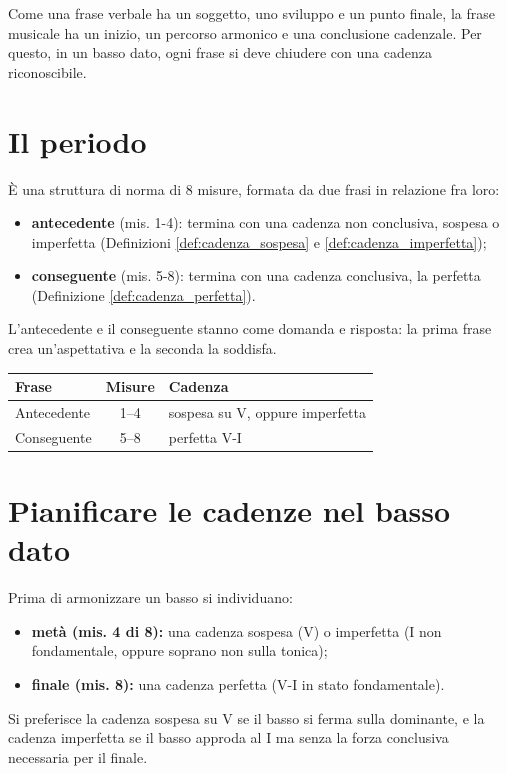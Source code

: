 Come una frase verbale ha un soggetto, uno sviluppo e un punto finale, la frase musicale ha un inizio, un percorso armonico e una conclusione cadenzale. Per questo, in un basso dato, ogni frase si deve chiudere con una cadenza riconoscibile.

\section{Il periodo}
\label{sec:periodo}

\begin{definizione}[Il periodo]
    È una struttura di norma di 8 misure, formata da due frasi in relazione fra loro:
    \begin{itemize}
        \item \textbf{antecedente} (mis. 1-4): termina con una cadenza non conclusiva, sospesa o imperfetta (Definizioni \ref{def:cadenza_sospesa} e \ref{def:cadenza_imperfetta});
        \item \textbf{conseguente} (mis. 5-8): termina con una cadenza conclusiva, la perfetta (Definizione \ref{def:cadenza_perfetta}).
    \end{itemize}
\end{definizione}

L'antecedente e il conseguente stanno come domanda e risposta: la prima frase crea un'aspettativa e la seconda la soddisfa.

\begin{center}
\begin{tabular}{lcl}
\toprule
\textbf{Frase} & \textbf{Misure} & \textbf{Cadenza} \\
\midrule
Antecedente & 1--4 & sospesa su V, oppure imperfetta \\
Conseguente & 5--8 & perfetta V-I \\
\bottomrule
\end{tabular}
\end{center}

\section{Pianificare le cadenze nel basso dato}
\label{sec:applicazione_frase}

\begin{regola}
    Prima di armonizzare un basso si individuano:
    \begin{itemize}
        \item \textbf{metà (mis. 4 di 8):} una cadenza sospesa (V) o imperfetta (I non fondamentale, oppure soprano non sulla tonica);
        \item \textbf{finale (mis. 8):} una cadenza perfetta (V-I in stato fondamentale).
    \end{itemize}
\end{regola}

\begin{regola}
    Si preferisce la cadenza sospesa su V se il basso si ferma sulla dominante, e la cadenza imperfetta se il basso approda al I ma senza la forza conclusiva necessaria per il finale.
\end{regola}
